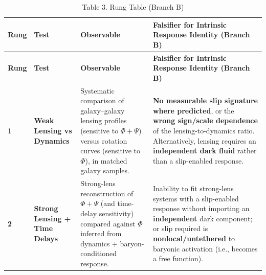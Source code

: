 \documentclass[11pt]{article}
\begin{document}
\begin{longtable}[]{@{}
  >{\centering\arraybackslash}p{}
  >{\raggedright\arraybackslash}p{}
  >{\raggedright\arraybackslash}p{}
  >{\raggedright\arraybackslash}p{}@{}}
\caption{\protect{}\label{_Toc222952633}{}Table 3. Rung Table (Branch B)}\tabularnewline
\toprule\noalign{}
\begin{minipage}[b]{\linewidth}\centering
\textbf{Rung}
\end{minipage} & \begin{minipage}[b]{\linewidth}\centering
\textbf{Test}
\end{minipage} & \begin{minipage}[b]{\linewidth}\centering
\textbf{Observable}
\end{minipage} & \begin{minipage}[b]{\linewidth}\centering
\textbf{Falsifier for Intrinsic Response Identity (Branch B)}
\end{minipage} \\
\midrule\noalign{}
\endfirsthead
\toprule\noalign{}
\begin{minipage}[b]{\linewidth}\centering
\textbf{Rung}
\end{minipage} & \begin{minipage}[b]{\linewidth}\centering
\textbf{Test}
\end{minipage} & \begin{minipage}[b]{\linewidth}\centering
\textbf{Observable}
\end{minipage} & \begin{minipage}[b]{\linewidth}\centering
\textbf{Falsifier for Intrinsic Response Identity (Branch B)}
\end{minipage} \\
\midrule\noalign{}
\endhead
\bottomrule\noalign{}
\endlastfoot
\textbf{1} & \textbf{Weak Lensing vs Dynamics} & Systematic comparison of galaxy--galaxy lensing profiles (sensitive to \(\Phi + \Psi\)) versus rotation curves (sensitive to \(\Phi\)), in matched galaxy samples. & \textbf{No measurable slip signature where predicted}, or the \textbf{wrong sign/scale dependence} of the lensing-to-dynamics ratio. Alternatively, lensing requires an \textbf{independent dark fluid} rather than a slip-enabled response. \\
\textbf{2} & \textbf{Strong Lensing + Time Delays} & Strong-lens reconstruction of \(\Phi + \Psi\) (and time-delay sensitivity) compared against \(\Phi\) inferred from dynamics + baryon-conditioned response. & Inability to fit strong-lens systems with a slip-enabled response without importing an \textbf{independent} dark component; or slip required is \textbf{nonlocal/untethered} to baryonic activation (i.e., becomes a free function). \\

\end{longtable}
\end{document}
